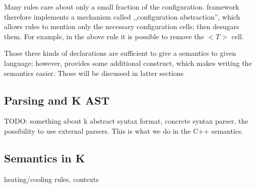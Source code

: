 \documentclass{fithesis3}
\begin{document}


Many rules care about only a small fraction of the configuration. \K framework therefore implements a mechanism called ,,configuration abstraction'', which allows rules to mention only the necessary configuration cells; \K then desugars them. For example, in the above rule it is possible to remove the $<T>$ cell.









Those three kinds of \K declarations are sufficient to give a semantics to given language; however, \K provides some additional construct, which makes writing the semantics easier. Those will be discussed in latter sections


\subsection{Parsing and K AST}
TODO: something about k abstract syntax format, concrete syntax parser, the possibility to use external parsers. This is what we do in the C++ semantics.

\subsection{Semantics in K}

heating/cooling rules, contexts
\end{document}

